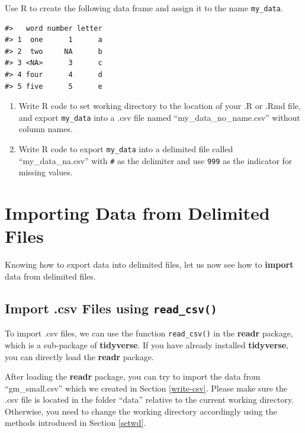 \documentclass[
]{book}
\begin{document}
Use R to create the following data frame and assign it to the name \texttt{my\_data}.

\begin{verbatim}
#>   word number letter
#> 1  one      1      a
#> 2  two     NA      b
#> 3 <NA>      3      c
#> 4 four      4      d
#> 5 five      5      e
\end{verbatim}

\begin{enumerate}
\def\labelenumi{\arabic{enumi}.}
\item
  Write R code to set working directory to the location of your .R or .Rmd file, and export \texttt{my\_data} into a .csv file named ``my\_data\_no\_name.csv'' without column names.
\item
  Write R code to export \texttt{my\_data} into a delimited file called ``my\_data\_na.csv'' with \texttt{\#} as the delimiter and use \texttt{999} as the indicator for missing values.
\end{enumerate}

\hypertarget{import-data}{%
\section{Importing Data from Delimited Files}\label{import-data}}

Knowing how to export data into delimited files, let us now see how to \textbf{import} data from delimited files.

\hypertarget{import-.csv-files-using-read_csv}{%
\subsection{\texorpdfstring{Import .csv Files using \texttt{read\_csv()}}{Import .csv Files using read\_csv()}}\label{import-.csv-files-using-read_csv}}

To import .csv files, we can use the function \texttt{read\_csv()} in the \textbf{readr} package, which is a sub-package of \textbf{tidyverse}. If you have already installed \textbf{tidyverse}, you can directly load the \textbf{readr} package.

After loading the \textbf{readr} package, you can try to import the data from ``gm\_small.csv'' which we created in Section \ref{write-csv}. Please make sure the .csv file is located in the folder ``data'' relative to the current working directory. Otherwise, you need to change the working directory accordingly using the methods introduced in Section \ref{setwd}.
\end{document}
